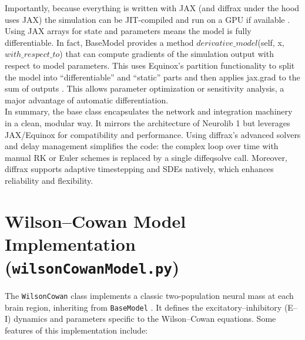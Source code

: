 \documentclass[11pt,a4paper]{article}
\begin{document}
Importantly, because everything is written with JAX (and diffrax under the hood uses JAX) the simulation can
be JIT-compiled and run on a GPU if available \cite{kidger2021equinox}. Using JAX arrays for state and parameters means the model is
fully differentiable. In fact, BaseModel provides a method $derivative\_model$(self, x,
$with\_respect\_to$) that can compute gradients of the simulation output with respect to model
parameters. This uses Equinox’s partition functionality to split the model into “differentiable” and
“static” parts and then applies jax.grad to the sum of outputs \cite{kidger2021equinox}. This allows parameter optimization or
sensitivity analysis, a major advantage of automatic differentiation.\\

In summary, the base class encapsulates the network and integration machinery in a clean, modular way. It
mirrors the architecture of Neurolib 1 but leverages JAX/Equinox for compatibility and performance. Using
diffrax’s advanced solvers and delay management \cite{kidger2021neural} simplifies the code: the complex loop over time with
manual RK or Euler schemes is replaced by a single diffeqsolve call. Moreover, diffrax supports adaptive
timestepping and SDEs natively, which enhances reliability and flexibility.

\section{Wilson--Cowan Model Implementation (\texttt{wilsonCowanModel.py})}

The \texttt{WilsonCowan} class implements a classic two-population neural mass at each brain
region, inheriting from \texttt{BaseModel} \cite{wilson1972excitatory,wilson1973dynamics}. It defines the excitatory--inhibitory (E--I)
dynamics and parameters specific to the Wilson--Cowan equations. Some features of this
implementation include:
\end{document}
